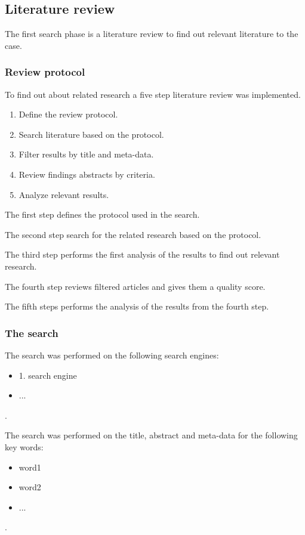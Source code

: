 \subsection{Literature review}
The first search phase is a literature review to find out relevant literature to the case.

\subsubsection{Review protocol}
To find out about related research a five step literature review was implemented.

\begin{enumerate}
    \item Define the review protocol.
    \item Search literature based on the protocol.
    \item Filter results by title and meta-data.
    \item Review findings abstracts by criteria.
    \item Analyze relevant results.
\end{enumerate}

The first step defines the protocol used in the search.

The second step search for the related research based on the protocol.

The third step performs the first analysis of the results to find out relevant research.

The fourth step reviews filtered articles and gives them a quality score.

The fifth steps performs the analysis of the results from the fourth step.

\subsubsection{The search}
The search was performed on the following search engines: 
\begin{itemize}
    \item 1. search engine
    \item ...
\end{itemize}.

The search was performed on the title, abstract and meta-data for the following key words:
\begin{itemize}
    \item word1
    \item word2
    \item ...
\end{itemize}.

